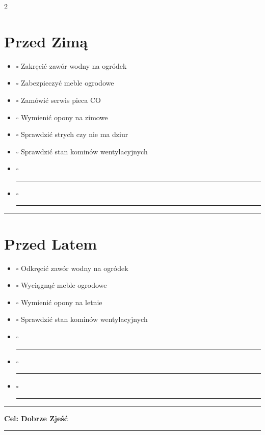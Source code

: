 \documentclass[a4paper, 12pt]{article} %
\newcommand{\weeklybox}{%
    \leavevmode\unskip\nobreak%
    {\Large$\square$}%
    \hspace{1ex}
}
\begin{document}
\begin{multicols}{2}

\section*{Przed Zimą}
\begin{itemize}
    \item \weeklybox Zakręcić zawór wodny na ogródek
    \item \weeklybox Zabezpieczyć meble ogrodowe
    \item \weeklybox Zamówić serwis pieca CO
    \item \weeklybox Wymienić opony na zimowe
    \item \weeklybox Sprawdzić strych czy nie ma dziur
    \item \weeklybox Sprawdzić stan kominów wentylacyjnych
    \item \weeklybox \rule[0pt]{5cm}{0.5pt}
    \item \weeklybox \rule[0pt]{5cm}{0.5pt}
\end{itemize}
\hrule

\section*{Przed Latem}
\begin{itemize}
    \item \weeklybox Odkręcić zawór wodny na ogródek
    \item \weeklybox Wyciągnąć meble ogrodowe
    \item \weeklybox Wymienić opony na letnie
    \item \weeklybox Sprawdzić stan kominów wentylacyjnych
    \item \weeklybox \rule[0pt]{5cm}{0.5pt}
    \item \weeklybox \rule[0pt]{5cm}{0.5pt}
    \item \weeklybox \rule[0pt]{5cm}{0.5pt}
\end{itemize}
\hrule

\end{multicols}
\newpage

\begin{center}
    {\Huge\bfseries Cel: Dobrze Zjeść}
    \vspace{1em} %
\end{center}

\hrule
\end{document}
